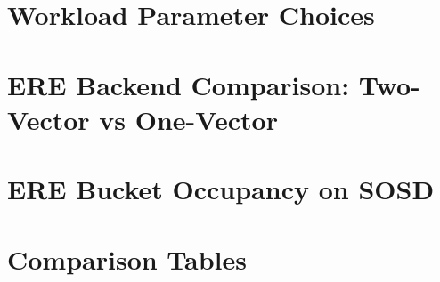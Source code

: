 \section{Workload Parameter Choices}
\label{sec:eval-workload-params}



\section{ERE Backend Comparison: Two-Vector vs One-Vector}
\label{sec:eval-ere-backend}



\section{ERE Bucket Occupancy on SOSD}
\label{sec:eval-bucket-occupancy}



%

\FloatBarrier


\section{Comparison Tables}
\label{sec:eval-tables}

